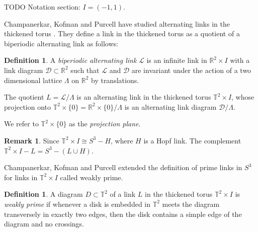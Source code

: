 \documentclass[11pt]{amsart}
\newcommand{\Sp}{{S}}
\newcommand{\R}{\mathbb{R}}
\newcommand{\torus}{{\mathbb{T}^2}}
\newcommand{\cD}{{\mathcal{D}}}
\newcommand{\cL}{{\mathcal{L}}}
\theoremstyle{plain}
\theoremstyle{definition}
\newtheorem{define}[theorem]{Definition}
\newtheorem{remark}[theorem]{Remark}
\begin{document}
TODO Notation section: $I = (-1,1)$.

Champanerkar, Kofman and Purcell have studied alternating links in the thickened
torus \cite{CKP2}. They define a link in the thickened torus as a quotient of a
biperiodic alternating link as follows:
 
\begin{define}
\label{def:biperiodiclink}
A \emph{biperiodic alternating link} $\cL$ is an infinite link
in $\R^2 \times I$ with a link diagram $\cD \subset \R^2$
such that $\cL$ and $\cD$ are
invariant under the action of a two dimensional lattice $\Lambda$
on $\R^2$ by translations.


The quotient $L=\mathcal{L}/\Lambda$ is an alternating link in
the thickened torus $\torus \times I$,
whose projection onto $\torus \times \{0\} = \R^2 \times \{0\} /\Lambda$
is an alternating link diagram $\cD/\Lambda$.
\end{define}


We refer to $\torus \times \{0\}$ as the \emph{projection plane}.


\begin{remark}
Since $\torus \times I \cong \Sp^3 - H$, where $H$ is a Hopf link.
The complement $\torus \times I- L = \Sp^3 - (L \cup H)$.
\end{remark}

Champanerkar, Kofman and Purcell \cite{CKP2} extended
the definition of prime links in $\Sp^3$
for links in $\torus \times I$ called weakly prime. 

\begin{define} \label{def:weaklyprime}
A diagram $D \subset \torus$
of a link $L$ in the thickened torus $\torus \times I$
is \emph{weakly prime}
if whenever a disk is embedded in $\torus$
meets the diagram transversely in exactly two edges,
then the disk contains a simple edge of the diagram and no crossings.
\end{define}
\end{document}

